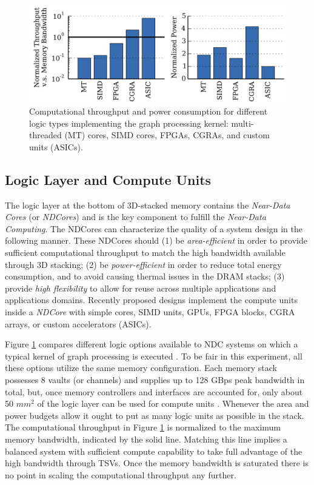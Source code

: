\documentclass[letterpaper, 11pt, conference, margin=1in]{ieeeconf}   %
\begin{document}
\begin{figure}
    \center
    \includegraphics[scale=0.20]{figures/comparison_ndcores.png}
    \caption{Computational throughput and power consumption for different logic types implementing the graph processing kernel: multi-threaded (MT) cores, SIMD cores, FPGAs, CGRAs, and custom units (ASICs).}
    \label{fig:NDC-comparison}
\end{figure}

\subsection{\bf Logic Layer and Compute Units}
The logic layer at the bottom of 3D-stacked memory contains the \textit{Near-Data Cores} (or \textit{NDCores}) and is the key component to fulfill the \textit{Near-Data Computing}. The NDCores can characterize the quality of a system design in the following manner. These NDCores should (1) be \textit{area-efficient} in order to provide sufficient computational throughput to match the high bandwidth available through 3D stacking; (2) be \textit{power-efficient} in order to reduce total energy consumption, and to avoid causing thermal issues in the DRAM stacks; (3) provide \textit{high flexibility} to allow for reuse across multiple applications and applications domains. Recently proposed designs implement the compute units inside a \textit{NDCore} with simple cores, SIMD units, GPUs, FPGA blocks, CGRA arrays, or custom accelerators (ASICs).

Figure \ref{fig:NDC-comparison} compares different logic options available to NDC systems on which a typical kernel of graph processing is executed \cite{7446059}. To be fair in this experiment, all these options utilize the same memory configuration. Each memory stack possesses 8 vaults (or channels) and supplies up to 128 GBps peak bandwidth in total, but, once memory controllers and interfaces are accounted for, only about 50 $mm^2$ of the logic layer can be used for compute units \cite{6242474}. Whenever the area and power budgets allow it ought to put as many logic units as possible in the stack. The computational throughput in Figure \ref{fig:NDC-comparison} is normalized to the maximum memory bandwidth, indicated by the solid line. Matching this line implies a balanced system with sufficient compute capability to take full advantage of the high bandwidth through TSVs. Once the memory bandwidth is saturated there is no point in scaling the computational throughput any further.
\end{document}

